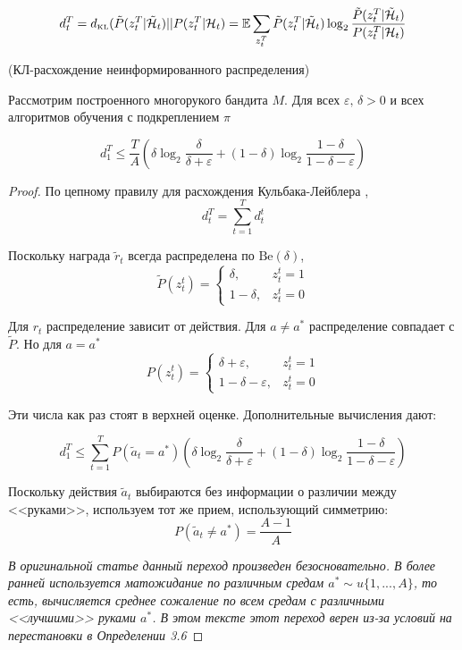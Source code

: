 \documentclass[a4paper]{article}
\newcommand{\Hh}{\mathcal{H}}
\newcommand{\E}{\mathbb{E}}
\newcommand{\Be}{\mbox{Be}}
\newcommand{\dkl}{d_{\mbox{\tiny KL}}}
\newcommand{\ltwo}{\log_2 }
\def\eps{\varepsilon}
\begin{document}
$$d_t^T=\dkl(\tilde{P}(z_t^T|\tilde{\Hh}_t)||P(z_t^T|\Hh_t)=\E\sum\limits_{z_t^T}\tilde{P}(z_t^T|\tilde{\Hh}_t)\ltwo\frac{\tilde{P}(z_t^T|\tilde{\Hh}_t)}{P(z_t^T|\Hh_t)}$$

\begin{lemma}{(КЛ-расхождение неинформированного распределения)}

Рассмотрим построенного многорукого бандита $M$. Для всех $\eps,\,\delta>0$ и всех алгоритмов обучения с подкреплением $\pi$

$$d_1^T\leqslant \frac{T}{A}\left(\delta\ltwo\frac{\delta}{\delta+\eps}+(1-\delta)\ltwo\frac{1-\delta}{1-\delta-\eps}\right)$$
\end{lemma}

\begin{proof} По цепному правилу для расхождения Кульбака-Лейблера \cite{bubeck}, \cite{games}
$$d_t^T=\sum\limits_{t=1}^T d_t^t$$

Поскольку награда $\tilde{r}_t$ всегда распределена по $\Be(\delta)$, $$\tilde{P}(z_t^t)=\begin{cases}
\delta, & z_t^t=1\\
1-\delta, & z_t^t=0
\end{cases}$$

Для $r_t$ распределение зависит от действия. Для $a\neq a^*$ распределение совпадает с $\tilde{P}$. Но для $a=a^*$
$$P(z_t^t)=\begin{cases}
\delta+\eps, & z_t^t=1\\
1-\delta-\eps, & z_t^t=0
\end{cases}$$

Эти числа как раз стоят в верхней оценке. Дополнительные вычисления \cite{bubeck} дают:

$$d_1^T\leqslant\sum\limits_{t=1}^T P(\tilde{a}_t= a^*)\left(\delta\ltwo\frac{\delta}{\delta+\eps}+(1-\delta)\ltwo\frac{1-\delta}{1-\delta-\eps}\right)$$

Поскольку действия $\tilde{a}_t$ выбираются без информации о различии между <<руками>>, используем тот же прием, использующий симметрию: $$P(\tilde{a}_t\neq a^*)=\frac{A-1}{A}$$

{\em В оригинальной статье \cite{lower_bounds} данный переход произведен безосновательно. В более ранней \cite{bubeck} используется матожидание по различным средам $a^*\sim u\{1,...,A\}$, то есть, вычисляется среднее сожаление по всем средам с различными <<лучшими>> руками $a^*$. В этом тексте этот переход верен из-за условий на перестановки в Определении 3.6}
\end{proof}
\end{document}

